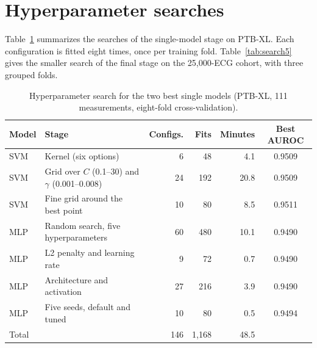 \documentclass[letterpaper,11pt]{article}
\begin{document}
\section{Hyperparameter searches}
\label{app:search}

Table~\ref{tab:search} summarizes the searches of the single-model stage on PTB-XL. Each configuration is fitted eight times, once per training fold. Table~\ref{tab:search5} gives the smaller search of the final stage on the 25,000-ECG cohort, with three grouped folds.

\begin{table}[H]
  \centering
  \caption{Hyperparameter search for the two best single models (PTB-XL, 111 measurements, eight-fold cross-validation).}
  \label{tab:search}
  \small
  \begin{tabular}{llrrrc}
    \toprule
    Model & Stage & Configs. & Fits & Minutes & Best AUROC \\
    \midrule
    SVM & Kernel (six options) & 6 & 48 & 4.1 & 0.9509 \\
    SVM & Grid over $C$ (0.1--30) and $\gamma$ (0.001--0.008) & 24 & 192 & 20.8 & 0.9509 \\
    SVM & Fine grid around the best point & 10 & 80 & 8.5 & 0.9511 \\
    MLP & Random search, five hyperparameters & 60 & 480 & 10.1 & 0.9490 \\
    MLP & L2 penalty and learning rate & 9 & 72 & 0.7 & 0.9490 \\
    MLP & Architecture and activation & 27 & 216 & 3.9 & 0.9490 \\
    MLP & Five seeds, default and tuned & 10 & 80 & 0.5 & 0.9494 \\
    \midrule
    Total & & 146 & 1,168 & 48.5 & \\
    \bottomrule
  \end{tabular}
\end{table}
\end{document}
